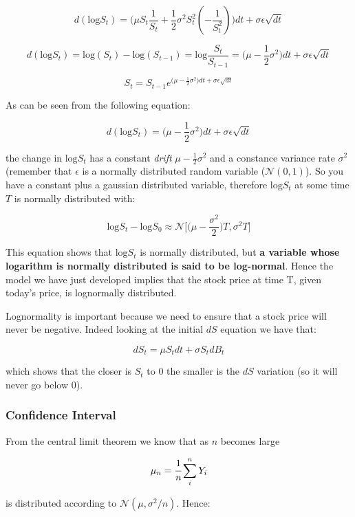 \documentclass[11pt]{article}
\begin{document}
\[d(\textrm{log} S_t) = \big(\mu S_t \frac{1}{S_t} + \frac{1}{2}\sigma^2 S_t^2 (-\frac{1}{S_t^2})\big)dt + \sigma\epsilon\sqrt{dt}\]

\[d(\textrm{log} S_t) = \textrm{log} (S_t) - \textrm{log} (S_{t-1}) = \textrm{log} \frac{S_t}{S_{t-1}} = \big(\mu - \frac{1}{2}\sigma^2\big)dt + \sigma\epsilon\sqrt{dt}\]

\[S_t = S_{t-1}e^{\big(\mu - \frac{1}{2}\sigma^2\big)dt + \sigma\epsilon\sqrt{dt}}\]

    As can be seen from the following equation:

\[d(\textrm{log} S_t) = \big(\mu - \frac{1}{2}\sigma^2\big)dt + \sigma\epsilon\sqrt{dt}\]

the change in \(\textrm{log} S_t\) has a constant \emph{drift}
\(\mu - \frac{1}{2}\sigma^2\) and a constance variance rate \(\sigma^2\)
(remember that \(\epsilon\) is a normally distributed random variable
(\(\mathcal{N}(0,1)\)). So you have a constant plus a gaussian
distributed variable, therefore \(\textrm{log} S_t\) at some time \(T\)
is normally distributed with:

\[\textrm{log}S_t - \textrm{log}S_0 \approx\mathcal{N}\big[\big(\mu-\frac{\sigma^2}{2}\big)T, \sigma^2 T\big]\]

This equation shows that \(\textrm{log}S_t\) is normally distributed,
but \textbf{a variable whose logarithm is normally distributed is said
to be log-normal}. Hence the model we have just developed implies that
the stock price at time T, given today's price, is lognormally
distributed.

Lognormality is important because we need to ensure that a stock price
will never be negative. Indeed looking at the initial \(dS\) equation we
have that:

\[dS_t = \mu S_tdt + \sigma S_tdB_t\]

which shows that the closer is \(S_t\) to 0 the smaller is the \(dS\)
variation (so it will never go below 0).

    \hypertarget{confidence-interval}{%
\subsubsection{Confidence Interval}\label{confidence-interval}}

From the central limit theorem we know that as \(n\) becomes large

\[ \mu_n = \cfrac{1}{n}\sum_i^n Y_i \]

is distributed according to \(\mathcal{N}(\mu, \sigma^2/n)\). Hence:
\end{document}
